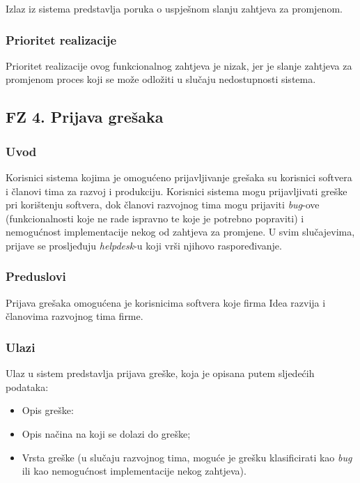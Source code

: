 \documentclass[12pt,a4paper]{article}
\begin{document}
Izlaz iz sistema predstavlja poruka o uspješnom slanju zahtjeva za promjenom.

\subsubsection{Prioritet realizacije}

Prioritet realizacije ovog funkcionalnog zahtjeva je nizak, jer je slanje zahtjeva za promjenom proces koji se može odložiti u slučaju nedostupnosti sistema.

\subsection{FZ 4. Prijava grešaka}

\subsubsection{Uvod}

Korisnici sistema kojima je omogućeno prijavljivanje grešaka su korisnici softvera i članovi tima za razvoj i produkciju. Korisnici sistema mogu prijavljivati greške pri korištenju softvera, dok članovi razvojnog tima mogu prijaviti \textit{bug}-ove (funkcionalnosti koje ne rade ispravno te koje je potrebno popraviti) i nemogućnost implementacije nekog od zahtjeva za promjene. U svim slučajevima, prijave se prosljeđuju \textit{helpdesk}-u koji vrši njihovo raspoređivanje.

\subsubsection{Preduslovi}

Prijava grešaka omogućena je korisnicima softvera koje firma Idea razvija i članovima razvojnog tima firme.

\subsubsection{Ulazi}

Ulaz u sistem predstavlja prijava greške, koja je opisana putem sljedećih podataka:

\begin{itemize}
\item Opis greške:
\item Opis načina na koji se dolazi do greške;
\item Vrsta greške (u slučaju razvojnog tima, moguće je grešku klasificirati kao \textit{bug} ili kao nemogućnost implementacije nekog zahtjeva).
\end{itemize}
\end{document}
